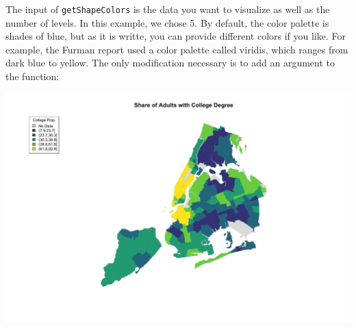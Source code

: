 \documentclass[
  openany]{book}
\newenvironment{Shaded}{\begin{snugshade}}{\end{snugshade}}
\newcommand{\AttributeTok}[1]{\textcolor[rgb]{0.77,0.63,0.00}{#1}}
\newcommand{\DecValTok}[1]{\textcolor[rgb]{0.00,0.00,0.81}{#1}}
\newcommand{\FloatTok}[1]{\textcolor[rgb]{0.00,0.00,0.81}{#1}}
\newcommand{\FunctionTok}[1]{\textcolor[rgb]{0.00,0.00,0.00}{#1}}
\newcommand{\NormalTok}[1]{#1}
\newcommand{\OtherTok}[1]{\textcolor[rgb]{0.56,0.35,0.01}{#1}}
\newcommand{\SpecialCharTok}[1]{\textcolor[rgb]{0.00,0.00,0.00}{#1}}
\newcommand{\StringTok}[1]{\textcolor[rgb]{0.31,0.60,0.02}{#1}}
\begin{document}
The input of \texttt{getShapeColors} is the data you want to visualize as well as the number of levels. In this example, we chose 5. By default, the color palette is shades of blue, but as it is writte, you can provide different colors if you like. For example, the Furman report used a color palette called viridis, which ranges from dark blue to yellow. The only modification necessary is to add an argument to the function:

\begin{Shaded}
\end{Shaded}

\begin{center}\includegraphics[width=0.9\linewidth]{carpedatum_files/figure-html/unnamed-chunk-90-1} \end{center}
\end{document}
